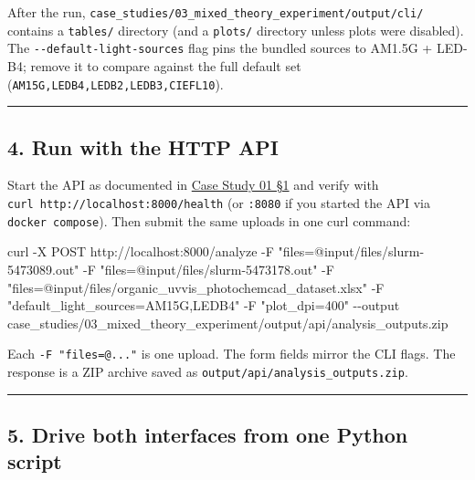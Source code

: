 \documentclass[
  11pt,
]{article}
\newenvironment{Shaded}{}{}
\newcommand{\AttributeTok}[1]{\textcolor[rgb]{0.49,0.56,0.16}{#1}}
\newcommand{\ExtensionTok}[1]{#1}
\newcommand{\NormalTok}[1]{#1}
\newcommand{\StringTok}[1]{\textcolor[rgb]{0.25,0.44,0.63}{#1}}
\begin{document}
After the run,
\texttt{case\_studies/03\_mixed\_theory\_experiment/output/cli/}
contains a \texttt{tables/} directory (and a \texttt{plots/} directory
unless plots were disabled). The \texttt{-\/-default-light-sources} flag
pins the bundled sources to AM1.5G + LED-B4; remove it to compare
against the full default set (\texttt{AM15G,LEDB4,LEDB2,LEDB3,CIEFL10}).

\begin{center}\rule{0.5\linewidth}{0.5pt}\end{center}

\hypertarget{4-run-with-the-http-api}{
\subsection{4. Run with the HTTP API}\label{4-run-with-the-http-api}}

Start the API as documented in
\href{https://github.com/pinarsyt/overlap-calculator/blob/main/case_studies/01_theoretical_only/README.md\#1-prerequisites}{Case
Study 01 §1} and verify with
\texttt{curl\ http://localhost:8000/health} (or \texttt{:8080} if you
started the API via \texttt{docker\ compose}). Then submit the same
uploads in one curl command:

\begin{Shaded}
\begin{Highlighting}[]
\ExtensionTok{curl} \AttributeTok{{-}X}\NormalTok{ POST http://localhost:8000/analyze }\AttributeTok{{-}F} \StringTok{"files=@input/files/slurm{-}5473089.out"} \AttributeTok{{-}F} \StringTok{"files=@input/files/slurm{-}5473178.out"} \AttributeTok{{-}F} \StringTok{"files=@input/files/organic\_uvvis\_photochemcad\_dataset.xlsx"} \AttributeTok{{-}F} \StringTok{"default\_light\_sources=AM15G,LEDB4"} \AttributeTok{{-}F} \StringTok{"plot\_dpi=400"} \AttributeTok{{-}{-}output}\NormalTok{ case\_studies/03\_mixed\_theory\_experiment/output/api/analysis\_outputs.zip}
\end{Highlighting}
\end{Shaded}

Each \texttt{-F\ "files=@..."} is one upload. The form fields mirror the
CLI flags. The response is a ZIP archive saved as
\texttt{output/api/analysis\_outputs.zip}.

\begin{center}\rule{0.5\linewidth}{0.5pt}\end{center}

\hypertarget{5-drive-both-interfaces-from-one-python-script}{
\subsection{5. Drive both interfaces from one Python
script}\label{5-drive-both-interfaces-from-one-python-script}}
\end{document}
